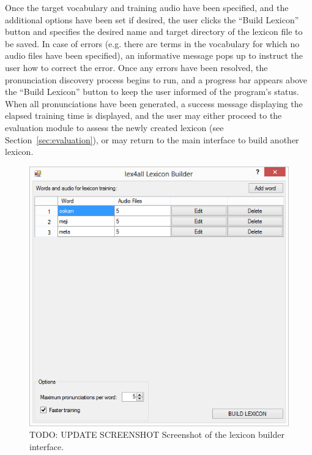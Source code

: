 \documentclass[11pt]{article}
\begin{document}
Once the target vocabulary and training audio have been specified, and the additional options have been set if desired, the user clicks the ``Build Lexicon'' button and specifies the desired name and target directory of the lexicon file to be saved. In case of errors (e.g. there are terms in the vocabulary for which no audio files have been specified), an informative message pops up to instruct the user how to correct the error. Once any errors have been resolved, the pronunciation discovery process begins to run, and a progress bar appears above the ``Build Lexicon'' button to keep the user informed of the program's status. When all pronunciations have been generated, a success message displaying the elapsed training time is displayed, and the user may either proceed to the evaluation module to assess the newly created lexicon (see Section~\ref{sec:evaluation}), or may return to the main interface to build another lexicon. 

\begin{figure}[tb]
\begin{center}
\includegraphics[width=\columnwidth]{../screenshots/LexiconBuilder-Main-Filled.PNG}
\caption{TODO: UPDATE SCREENSHOT Screenshot of the lexicon builder interface.\label{fig:mainform}}
\end{center}
\end{figure}
\end{document}
